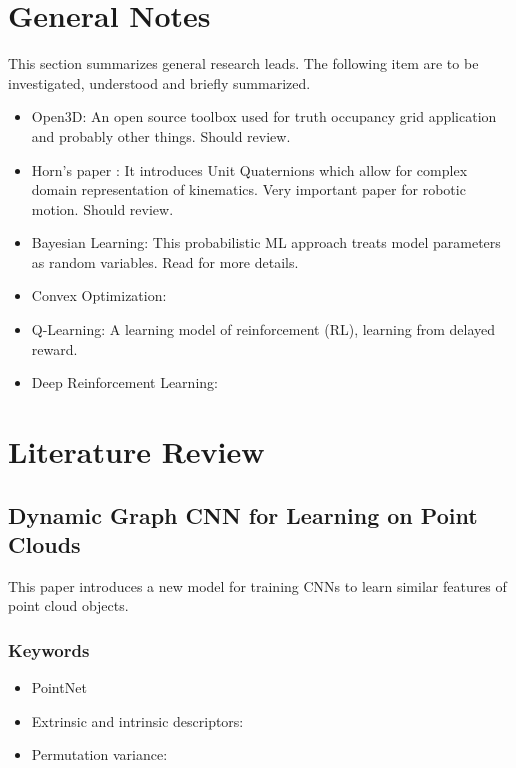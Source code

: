 \documentclass[11pt]{article}
\begin{document}
\section{General Notes}
This section summarizes general research leads. The following item are to be investigated, understood and briefly summarized. 

\begin{itemize}
	\item Open3D: An open source toolbox used for truth occupancy grid application and probably other things. Should review. 
	
	\item Horn's paper \cite{HornsMethod}: It introduces Unit Quaternions which allow for complex domain representation of kinematics. Very important paper for robotic motion. Should review.
	
	\item Bayesian Learning: This probabilistic ML approach treats model parameters as random variables. Read \cite{Bayesian_Learning_2012} for more details. 
	
	\item Convex Optimization:
	
	\item Q-Learning: A learning model of reinforcement (RL), learning from delayed reward. 
	
	\item Deep Reinforcement Learning: 
\end{itemize}

\section{Literature Review}

\subsection{Dynamic Graph CNN for Learning on Point Clouds \cite{DGCNNLPC}}
 This paper introduces a new model for training CNNs to learn similar features of point cloud objects. 

\subsubsection{Keywords}
\begin{itemize}
	\item PointNet
	\item Extrinsic and intrinsic descriptors:
	\item Permutation variance:
	
\end{itemize}
\end{document}
